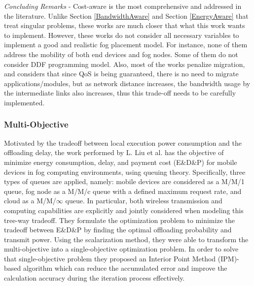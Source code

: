 \textit{Concluding Remarks} - Cost-aware is the most comprehensive and addressed in the literature. Unlike Section \ref{BandwidthAware} and Section \ref{EnergyAware} that treat singular problems, these works are much closer that what this work wants to implement. However, these works do not consider all necessary variables to implement a good and realistic fog placement model. For instance, none of them address the mobility of both end devices and fog nodes. Some of them do not consider DDF programming model. Also, most of the works penalize migration, and considers that since QoS is being guaranteed, there is no need to migrate applications/modules, but as network distance increases, the bandwidth usage by the intermediate links also increases, thus this trade-off needs to be carefully implemented.

\subsubsection{Multi-Objective}
\noindent\tab Motivated by the tradeoff between local execution power consumption and the offloading delay, the work performed by L. Liu et al. \cite{liu2018multiobjective} has the objective of minimize energy consumption, delay, and payment cost (E\&D\&P) for mobile devices in fog computing environments, using queuing theory. Specifically, three types of queues are applied, namely: mobile devices are considered as a M/M/1 queue, fog node as a M/M/c queue with a defined maximum request rate, and cloud as a M/M/$\infty$ queue. In particular, both wireless transmission and computing capabilities are explicitly and jointly considered when modeling this tree-way tradeoff. They formulate the optimization problem to minimize the tradeoff between E\&D\&P by finding the optimal offloading probability and transmit power. Using the scalarization method, they were able to transform the multi-objective into a single-objective optimization problem. In order to solve that single-objective problem they proposed an Interior Point Method (IPM)-based algorithm which can reduce the accumulated error and improve the calculation accuracy during the iteration process effectively.\\
